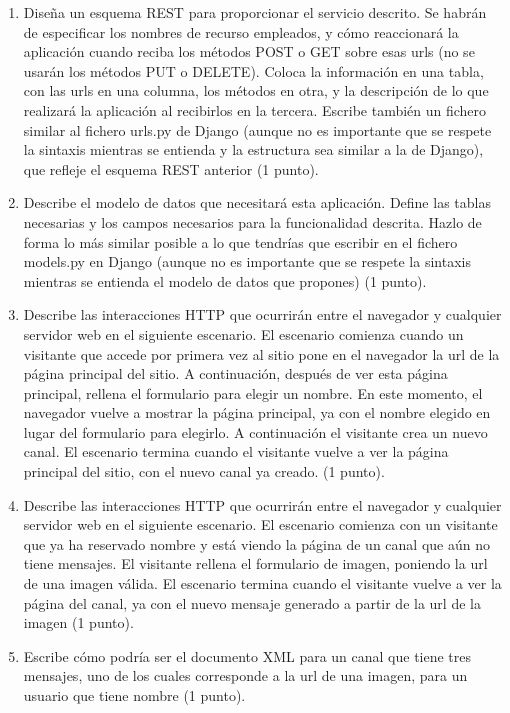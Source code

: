 \begin{enumerate}
\item Diseña un esquema REST para proporcionar el servicio descrito. Se habrán de especificar los nombres de recurso empleados, y cómo reaccionará la aplicación cuando reciba los métodos POST o GET sobre esas urls (no se usarán los métodos PUT o DELETE). Coloca la información en una tabla, con las urls en una columna, los métodos en otra, y la descripción de lo que realizará la aplicación al recibirlos en la tercera. Escribe también un fichero similar al fichero urls.py de Django (aunque no es importante que se respete la sintaxis mientras se entienda y la estructura sea similar a la de Django), que refleje el esquema REST anterior (1 punto).

\item Describe el modelo de datos que necesitará esta aplicación. Define las tablas necesarias y los campos necesarios para la funcionalidad descrita. Hazlo de forma lo más similar posible a lo que tendrías que escribir en el fichero models.py en Django (aunque no es importante que se respete la sintaxis mientras se entienda el modelo de datos que propones) (1 punto).

\item Describe las interacciones HTTP que ocurrirán entre el navegador y cualquier servidor web en el siguiente escenario. El escenario comienza cuando un visitante que accede por primera vez al sitio pone en el navegador la url de la página principal del sitio. A continuación, después de ver esta página principal, rellena el formulario para elegir un nombre. En este momento, el navegador vuelve a mostrar la página principal, ya con el nombre elegido en lugar del formulario para elegirlo. A continuación el visitante crea un nuevo canal. El escenario termina cuando el visitante vuelve a ver la página principal del sitio, con el nuevo canal ya creado. (1 punto).

\item Describe las interacciones HTTP que ocurrirán entre el navegador y cualquier servidor web en el siguiente escenario. El escenario comienza con un visitante que ya ha reservado nombre y está viendo la página de un canal que aún no tiene mensajes. El visitante rellena el formulario de imagen, poniendo la url de una imagen válida. El escenario termina cuando el visitante vuelve a ver la página del canal, ya con el nuevo mensaje generado a partir de la url de la imagen (1 punto).

\item Escribe cómo podría ser el documento XML para un canal que tiene tres mensajes, uno de los cuales corresponde a la url de una imagen, para un usuario que tiene nombre (1 punto).
\end{enumerate}

